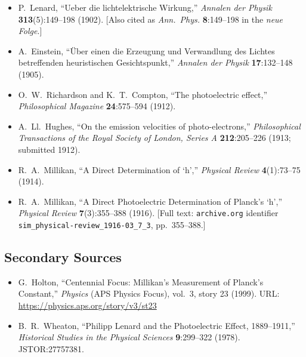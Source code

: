 \documentclass[12pt]{article}
\begin{document}
\begin{itemize}
\item[\textbf{[1]}] P.\ Lenard,
  ``Ueber die lichtelektrische Wirkung,''
  \emph{Annalen der Physik} \textbf{313}(5):149--198 (1902).
  [Also cited as \emph{Ann.\ Phys.} \textbf{8}:149--198 in the \emph{neue Folge}.]

\item[\textbf{[2]}] A.\ Einstein,
  ``\"Uber einen die Erzeugung und Verwandlung des Lichtes betreffenden
    heuristischen Gesichtspunkt,''
  \emph{Annalen der Physik} \textbf{17}:132--148 (1905).

\item[\textbf{[3]}] O.\ W.\ Richardson and K.\ T.\ Compton,
  ``The photoelectric effect,''
  \emph{Philosophical Magazine} \textbf{24}:575--594 (1912).

\item[\textbf{[4]}] A.\ Ll.\ Hughes,
  ``On the emission velocities of photo-electrons,''
  \emph{Philosophical Transactions of the Royal Society of London,
    Series A} \textbf{212}:205--226 (1913; submitted 1912).

\item[\textbf{[5]}] R.\ A.\ Millikan,
  ``A Direct Determination of `h',''
  \emph{Physical Review} \textbf{4}(1):73--75 (1914).

\item[\textbf{[6]}] R.\ A.\ Millikan,
  ``A Direct Photoelectric Determination of Planck's `h',''
  \emph{Physical Review} \textbf{7}(3):355--388 (1916).
  [Full text: \texttt{archive.org} identifier
   \texttt{sim\_physical-review\_1916-03\_7\_3}, pp.\ 355--388.]
\end{itemize}

\subsection*{Secondary Sources}

\begin{itemize}
\item[\textbf{[7]}] G.\ Holton,
  ``Centennial Focus: Millikan's Measurement of Planck's Constant,''
  \emph{Physics} (APS Physics Focus), vol.\ 3, story 23 (1999).
  URL: \url{https://physics.aps.org/story/v3/st23}

\item[\textbf{[8]}] B.\ R.\ Wheaton,
  ``Philipp Lenard and the Photoelectric Effect, 1889--1911,''
  \emph{Historical Studies in the Physical Sciences}
  \textbf{9}:299--322 (1978).
    JSTOR:27757381.
\end{itemize}
\end{document}
